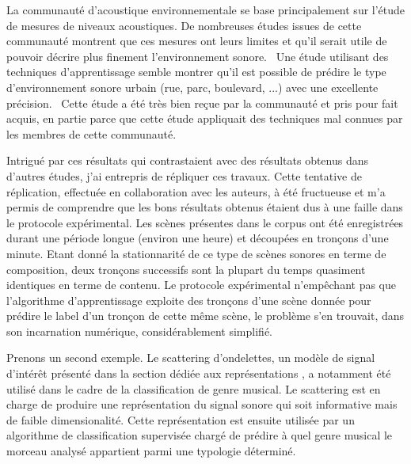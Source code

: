 La communauté d'acoustique environnementale se base principalement sur l'étude de mesures de niveaux acoustiques. De nombreuses études issues de cette communauté montrent que ces mesures ont leurs limites et qu'il serait utile de pouvoir décrire plus finement l'environnement sonore.~\cite{lavandier2006contribution} Une étude utilisant des techniques d'apprentissage semble montrer qu'il est possible de prédire le type d'environnement sonore urbain (rue, parc, boulevard, ...) avec une excellente précision.~\cite{aucouturier2007bag} Cette étude a été très bien reçue par la communauté et pris pour fait acquis, en partie parce que cette étude appliquait des techniques mal connues par les membres de cette communauté.

Intrigué par ces résultats qui contrastaient avec des résultats obtenus dans d'autres études, j'ai entrepris de répliquer ces travaux. Cette tentative de réplication, effectuée en collaboration avec les auteurs, à été fructueuse et m'a permis de comprendre que les bons résultats obtenus étaient dus à une faille dans le protocole expérimental\cite{lagrange2015}. Les scènes présentes dans le corpus ont été enregistrées durant une période longue (environ une heure) et découpées en tronçons d'une minute. Etant donné la stationnarité de ce type de scènes sonores en terme de composition, deux tronçons successifs sont la plupart du temps quasiment identiques en terme de contenu. Le protocole expérimental n'empêchant pas que l'algorithme d'apprentissage exploite des tronçons d'une scène donnée pour prédire le label d'un tronçon de cette même scène, le problème s'en trouvait, dans son incarnation numérique, considérablement simplifié. 

Prenons un second exemple. Le scattering d'ondelettes, un modèle de signal d'intérêt présenté dans la section dédiée aux représentations , a notamment été utilisé dans le cadre de la classification de genre musical\cite{anden2014deep}. Le scattering est en charge de produire une représentation du signal sonore qui soit informative mais de faible dimensionalité. Cette représentation est ensuite utilisée par un algorithme de classification supervisée chargé de prédire à quel genre musical le morceau analysé appartient parmi une typologie déterminé.

